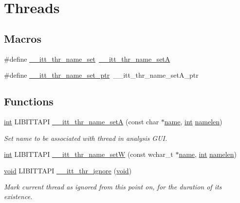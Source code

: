 \hypertarget{group__legacy__threads}{\section{Threads}
\label{group__legacy__threads}
}
\subsection*{Macros}
\begin{DoxyCompactItemize}
\item 
\#define \hyperlink{group__legacy__threads_ga01a4106860d96c6d77c31b3e35e7c5ac}{\-\_\-\-\_\-itt\-\_\-thr\-\_\-name\-\_\-set}~\hyperlink{group__legacy__threads_gabca4e69158b6ce29fcc0378616ac316a}{\-\_\-\-\_\-itt\-\_\-thr\-\_\-name\-\_\-set\-A}
\item 
\#define \hyperlink{group__legacy__threads_gaa3690d1b081fe1b2e6b47778f51a2904}{\-\_\-\-\_\-itt\-\_\-thr\-\_\-name\-\_\-set\-\_\-ptr}~\-\_\-\-\_\-itt\-\_\-thr\-\_\-name\-\_\-set\-A\-\_\-ptr
\end{DoxyCompactItemize}
\subsection*{Functions}
\begin{DoxyCompactItemize}
\item 
\hyperlink{ittnotify__static_8h_a8b8dcd723308a8cb5d84277c7a3fff70}{int} L\-I\-B\-I\-T\-T\-A\-P\-I \hyperlink{group__legacy__threads_gabca4e69158b6ce29fcc0378616ac316a}{\-\_\-\-\_\-itt\-\_\-thr\-\_\-name\-\_\-set\-A} (const char $\ast$\hyperlink{ittnotify__static_8h_a1c34b35a4952969fef60192313bba34a}{name}, \hyperlink{ittnotify__static_8h_a8b8dcd723308a8cb5d84277c7a3fff70}{int} \hyperlink{ittnotify__static_8h_ad09d4488ac9ab9e8311005b45b81f4f2}{namelen})
\begin{DoxyCompactList}\small\item\em Set name to be associated with thread in analysis G\-U\-I. \end{DoxyCompactList}\item 
\hyperlink{ittnotify__static_8h_a8b8dcd723308a8cb5d84277c7a3fff70}{int} L\-I\-B\-I\-T\-T\-A\-P\-I \hyperlink{group__legacy__threads_ga6106bca8a2390f16d3c404f32fa5aa9d}{\-\_\-\-\_\-itt\-\_\-thr\-\_\-name\-\_\-set\-W} (const wchar\-\_\-t $\ast$\hyperlink{ittnotify__static_8h_a1c34b35a4952969fef60192313bba34a}{name}, \hyperlink{ittnotify__static_8h_a8b8dcd723308a8cb5d84277c7a3fff70}{int} \hyperlink{ittnotify__static_8h_ad09d4488ac9ab9e8311005b45b81f4f2}{namelen})
\item 
\hyperlink{ittnotify__static_8h_af941d56e55e3c5465135b60c4d6343ed}{void} L\-I\-B\-I\-T\-T\-A\-P\-I \hyperlink{group__legacy__threads_gae17553b2bca44e1d2e4696fc69a06abf}{\-\_\-\-\_\-itt\-\_\-thr\-\_\-ignore} (\hyperlink{ittnotify__static_8h_af941d56e55e3c5465135b60c4d6343ed}{void})
\begin{DoxyCompactList}\small\item\em Mark current thread as ignored from this point on, for the duration of its existence. \end{DoxyCompactList}\end{DoxyCompactItemize}


